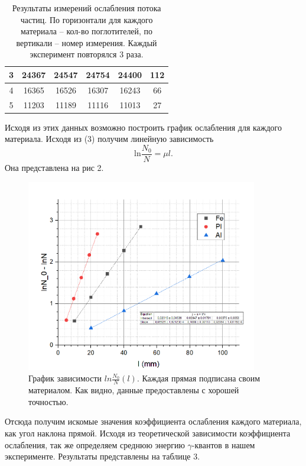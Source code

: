 \documentclass[a4paper, 14pt]{extarticle}%
\newcommand\ECaption[1]{%
     \captionsetup{font=footnotesize}%
     \caption{#1}}
\begin{document}
\begin{table}[h!]
\begin{center}
\begin{tabular}{|c|c|c|c|c|c|}
3        & 24367 & 24547 & 24754 & 24400                                & 112                        \\ \hline
\rowcolor[HTML]{CBCEFB} 
4        & 16365 & 16526 & 16307 & 16243                                & 66                         \\ \hline
5        & 11203 & 11189 & 11116 & 11013                                & 27                         \\ \hline
\end{tabular}
\ECaption{Результаты измерений ослабления потока частиц. По горизонтали для каждого материала -- кол-во поглотителей, по вертикали -- номер измерения. Каждый эксперимент повторялся 3 раза. }
\end{center}
\end{table}

Исходя из этих данных возможно построить график ослабления для каждого материала. Исходя из (3) получим линейную зависимость 
\begin{equation}
 \text{ln}\frac{N_0}{N}=\mu l.
\end{equation}
Она представлена на рис 2.

\begin{figure}[h!]
\begin{center}
\includegraphics[width=0.9\textwidth]{gr}
\end{center}
\ECaption{График зависимости $ln\frac{N_0}{N}(l)$. Каждая прямая подписана своим материалом. Как видно, данные предоставлены с хорошей точностью.}
\end{figure}

Отсюда получим искомые значения коэффициента ослабления каждого материала, как угол наклона прямой. Исходя из теоретической зависимости коэффициента ослабления, так же определяем среднюю энергию $\gamma$-квантов в нашем эксперименте. Результаты представлены на таблице 3.
\end{document}

